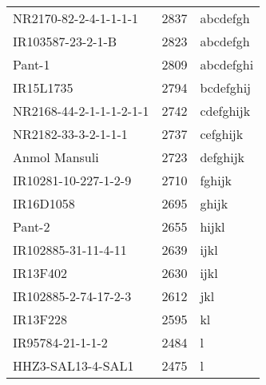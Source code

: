 \documentclass[]{article}
\begin{document}
\begin{longtable}{lll}
NR2170-82-2-4-1-1-1-1 & 2837 & abcdefgh\\
\rowcolor{gray!6}  IR103587-23-2-1-B & 2823 & abcdefgh\\
Pant-1 & 2809 & abcdefghi\\
\addlinespace
\rowcolor{gray!6}  IR15L1735 & 2794 & bcdefghij\\
NR2168-44-2-1-1-1-2-1-1 & 2742 & cdefghijk\\
\rowcolor{gray!6}  NR2182-33-3-2-1-1-1 & 2737 & cefghijk\\
Anmol Mansuli & 2723 & defghijk\\
\rowcolor{gray!6}  IR10281-10-227-1-2-9 & 2710 & fghijk\\
\addlinespace
IR16D1058 & 2695 & ghijk\\
\rowcolor{gray!6}  Pant-2 & 2655 & hijkl\\
IR102885-31-11-4-11 & 2639 & ijkl\\
\rowcolor{gray!6}  IR13F402 & 2630 & ijkl\\
IR102885-2-74-17-2-3 & 2612 & jkl\\
\addlinespace
\rowcolor{gray!6}  IR13F228 & 2595 & kl\\
IR95784-21-1-1-2 & 2484 & l\\
\rowcolor{gray!6}  HHZ3-SAL13-4-SAL1 & 2475 & l\\
\bottomrule
\end{longtable}
\endgroup{}
\begingroup\fontsize{12}{14}\selectfont
\end{document}
